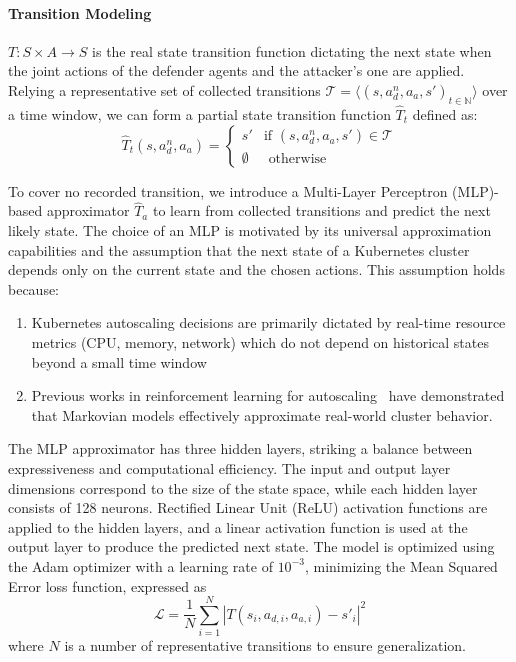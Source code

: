 \noindent \paragraph{\textbf{Transition Modeling}} $T: S \times A \rightarrow S$ is the real state transition function dictating the next state when the joint actions of the defender agents and the attacker's one are applied. Relying a representative set of collected transitions $\mathcal{T} = \langle(s, a_d^n, a_a, s')_{t\in \mathbb{N}}\rangle$ over a time window, we can form a partial state transition function $\hat{T}_t$ defined as:
%
$$
\hat{T}_t(s, a_d^n, a_a) =
\begin{cases} 
    s' & \text{if } (s, a_d^n, a_a, s') \in \mathcal{T} \\
    \emptyset & \text{ otherwise}
\end{cases}
$$

To cover no recorded transition, we introduce a Multi-Layer Perceptron (MLP)-based approximator $\hat{T}_a$ to learn from collected transitions and predict the next likely state. The choice of an MLP is motivated by its universal approximation capabilities and the assumption that the next state of a Kubernetes cluster depends only on the current state and the chosen actions. This assumption holds because:
\begin{enumerate}[label={\roman*)}, itemjoin={;\quad }]
    \item Kubernetes autoscaling decisions are primarily dictated by real-time resource metrics (CPU, memory, network) which do not depend on historical states beyond a small time window
    \item Previous works in reinforcement learning for autoscaling~\cite{Gari2021} have demonstrated that Markovian models effectively approximate real-world cluster behavior.
\end{enumerate}
The MLP approximator has three hidden layers, striking a balance between expressiveness and computational efficiency. The input and output layer dimensions correspond to the size of the state space, while each hidden layer consists of 128 neurons. Rectified Linear Unit (ReLU) activation functions are applied to the hidden layers, and a linear activation function is used at the output layer to produce the predicted next state. The model is optimized using the Adam optimizer with a learning rate of $10^{-3}$, minimizing the Mean Squared Error loss function, expressed as
$$
\mathcal{L} = \frac{1}{N} \sum_{i=1}^N |T(s_i, a_{d,i}, a_{a,i}) - s'_i|^2
$$
where $N$ is a number of representative transitions to ensure generalization.

